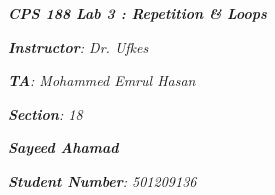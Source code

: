 

\begin{titlepage}
    \begin{center}
        \vspace*{1cm}
            
        \date{}
            
        \huge
            
        \textit{\textbf{CPS 188 Lab 3 : Repetition \& Loops}}
            
        \vspace{0.25cm}
            
            
        \vspace{2.5cm}
            
		\vspace{0.25cm}
            
            
        \LARGE

		\textit{\textbf{Instructor}: Dr. Ufkes}

		\textit{\textbf{TA}: Mohammed Emrul Hasan}

		\textit{\textbf{Section}: 18}

		\vspace{2.5cm}

		\textit{\textbf{Sayeed Ahamad}}           
            
        \Large         

		\vspace{5cm}

		\vspace{0cm}            
            
		\Large		
		        
		\vspace{0.25cm} 
		
		\textit{\textbf{Student Number}: 501209136}
            
        \vspace{2cm}
            
        \Large
         
		\vspace{0.25cm}                  
            
        \vspace{0.25cm}
           
            
    \end{center}
\end{titlepage}



